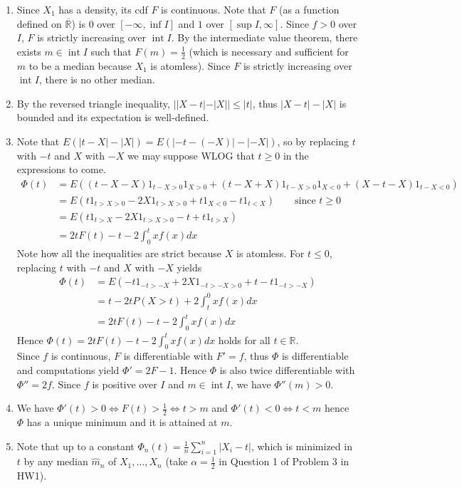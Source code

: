 \documentclass[a4paper,11pt]{article}
\DeclareMathOperator*{\inte}{int}
\begin{document}
\begin{enumerate}
  \item Since $X_1$ has a density, its cdf $F$ is continuous. Note that $F$ (as a function defined on $\overline{\mathbb R}$) is $0$ over $[-\infty, \inf I]$ and $1$ over $[\sup I, \infty]$. Since $f>0$ over $I$, $F$ is strictly increasing over $\inte I$. By the intermediate value theorem, there exists $m\in \inte I$ such that $F(m)=\frac 12$ (which is necessary and sufficient for $m$ to be a median because $X_1$ is atomless). Since $F$ is strictly increasing over $\inte I$, there is no other median.
  \item By the reversed triangle inequality, $||X-t|-|X|| \leq |t|$, thus $|X-t|-|X|$ is bounded and its expectation is well-defined.
  \item Note that $E(|t-X|-|X|) = E(|-t-(-X)|-|-X|)$, so by replacing $t$ with $-t$ and $X$ with $-X$ we may suppose WLOG that $t\geq 0$ in the expressions to come.
  $$\begin{aligned}
    \Phi(t) &= E((t-X-X)1_{t-X>0}1_{X>0} + (t-X+X)1_{t-X>0}1_{X<0} + (X-t-X)1_{t-X<0})\\
    &= E(t1_{t>X>0} -2X1_{t>X>0} + t1_{X<0} -t1_{t<X}) \qquad \text{since } t\geq 0\\
    &= E(t1_{t>X} -2X1_{t>X>0} -t + t1_{t>X})\\
    &= 2tF(t) -t-2\int_0^t xf(x) dx
  \end{aligned}$$
  Note how all the inequalities are strict because $X$ is atomless. For $t\leq 0$, replacing $t$ with $-t$ and $X$ with $-X$ yields 
  $$\begin{aligned}
    \Phi(t) &= E(-t1_{-t>-X} +2X1_{-t>-X>0} +t -t1_{-t>-X}) \\
    &=t-2tP(X>t)+2\int_t^0xf(x)dx \\
    &= 2tF(t) -t-2\int_0^t xf(x) dx
  \end{aligned}$$
  Hence $\Phi(t) = 2tF(t) -t-2\int_0^t xf(x) dx$ holds for all $t\in \mathbb R$.\\
  Since $f$ is continuous, $F$ is differentiable with $F'=f$, thus $\Phi$ is differentiable and computations yield $\Phi'=2F-1$. Hence $\Phi$ is also twice differentiable with $\Phi''=2f$. Since $f$ is positive over $I$ and $m\in \inte I$, we have $\Phi''(m)>0$.
  \item We have $\Phi'(t)>0 \iff F(t)>\frac 12\iff t>m$ and $\Phi'(t)<0 \iff t<m$ hence $\Phi$ has a unique minimum and it is attained at $m$.
  \item 
  Note that up to a constant $\Phi_n(t)=\frac 1n \sum_{i=1}^n |X_i-t|$, which is minimized in $t$ by any median $\hat m_n$ of $X_1,\ldots, X_n$ (take $\alpha=\frac 12$ in Question 1 of Problem 3 in HW1).\\

\end{enumerate}
\end{document}
